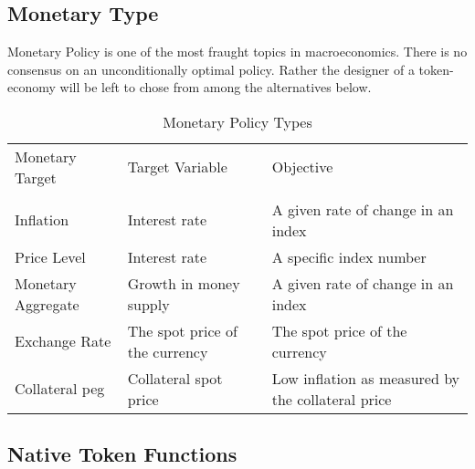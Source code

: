 \documentclass[11pt]{article}
\begin{document}
\begin{center}
\end{center}

\subsection{Monetary Type}
Monetary Policy is one of the most fraught topics in macroeconomics. There is no consensus on an unconditionally optimal policy. Rather the designer of a token-economy will be left to chose from among the alternatives below.
\begin{table}[!ht]
\caption{Monetary Policy Types} %
\centering %
\begin{tabular}{l l l} %
\hline\hline %
Monetary Target & Target Variable & Objective \\ [0.5ex]
\\ [0.5ex]
\hline %
Inflation & Interest rate & A given rate of change in an index \\
Price Level & Interest rate & A specific index number \\
Monetary Aggregate & Growth in money supply & A given rate of change in an index \\ 
Exchange Rate & The spot price of the currency & The spot price of the currency \\ 
Collateral peg & Collateral spot price & Low inflation as measured by the collateral price \\ 
\hline %

\end{tabular}
\end{table}

\subsection{Native Token Functions}
\end{document}
